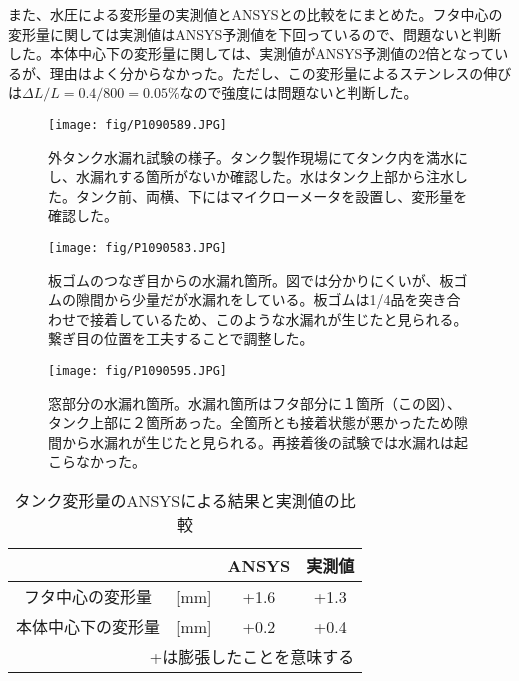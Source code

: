 また、水圧による変形量の実測値とANSYSとの比較をにまとめた。フタ中心の変形量に関しては実測値はANSYS予測値を下回っているので、問題ないと判断した。本体中心下の変形量に関しては、実測値がANSYS予測値の2倍となっているが、理由はよく分からなかった。ただし、この変形量によるステンレスの伸びは$\Delta L/L=0.4/800=0.05$\%なので強度には問題ないと判断した。


\begin{figure}[htbp]
\centering
\texttt{[image: fig/P1090589.JPG]}
\caption[外タンク水漏れ試験の様子]{外タンク水漏れ試験の様子。タンク製作現場にてタンク内を満水にし、水漏れする箇所がないか確認した。水はタンク上部から注水した。タンク前、両横、下にはマイクローメータを設置し、変形量を確認した。}
\label{WaterTest}
\end{figure}


\begin{figure}[htbp]
\begin{minipage}{0.47\textwidth}
\centering
\texttt{[image: fig/P1090583.JPG]}
\caption[板ゴムのつなぎ目からの水漏れ箇所]{板ゴムのつなぎ目からの水漏れ箇所。図では分かりにくいが、板ゴムの隙間から少量だが水漏れをしている。板ゴムは1/4品を突き合わせで接着しているため、このような水漏れが生じたと見られる。繋ぎ目の位置を工夫することで調整した。}
\label{WaterTestItagomu}
\end{minipage}
\hfil
\begin{minipage}{0.47\textwidth}
\centering
\texttt{[image: fig/P1090595.JPG]}
\caption[窓部分からの水漏れ箇所]{窓部分の水漏れ箇所。水漏れ箇所はフタ部分に１箇所（この図）、タンク上部に２箇所あった。全箇所とも接着状態が悪かったため隙間から水漏れが生じたと見られる。再接着後の試験では水漏れは起こらなかった。}
\label{WaterTestMado}
\end{minipage}
\end{figure}

\begin{table}[htbp]
\caption[ANSYSの結果と、実際のタンク変形量]{タンク変形量のANSYSによる結果と実測値の比較}
\centering
\begin{tabular}{clcc}
\hline \hline
& & ANSYS & 実測値 \\
 \hline
フタ中心の変形量 & [mm] & +1.6 & +1.3\\
本体中心下の変形量 & [mm] & +0.2 & +0.4 \\
\hline \hline
\multicolumn{4}{r}{+は膨張したことを意味する}
\end{tabular}
\label{CompDeform}
\end{table}

